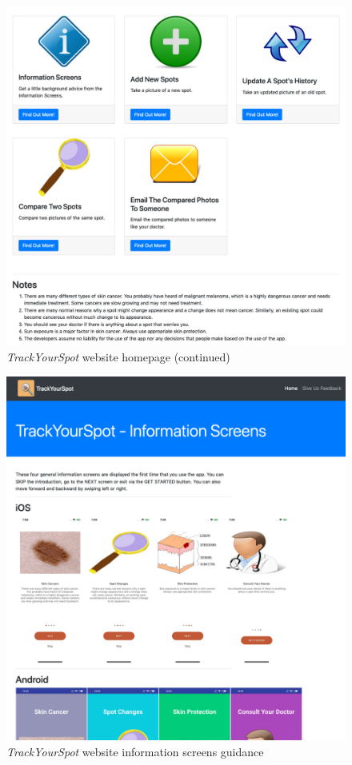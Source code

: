 \begin{figure}
    \includegraphics[width=1\textwidth, center]{figures/webdeployhome2.png}
    \caption{\emph{TrackYourSpot} website homepage (continued)}
    \label{fig:webdeployhome2}
\end{figure}

\begin{figure}
    \includegraphics[width=1\textwidth, center]{figures/webdeployinfo.png}
    \caption{\emph{TrackYourSpot} website information screens guidance}
    \label{fig:webdeployinfo}
\end{figure}


